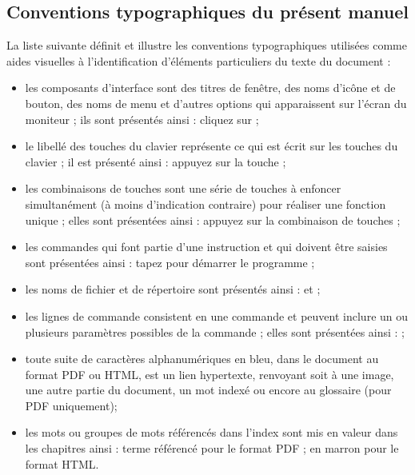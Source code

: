 \subsection{Conventions typographiques du présent manuel\label{introduction-manual-conventions}}

La liste suivante définit et illustre les conventions typographiques utilisées comme aides visuelles à l'identification d'éléments particuliers du texte du document :

\begin{itemize}
	\item les composants d'interface sont des titres de fenêtre, des noms d'icône et de bouton, des noms de menu et d'autres options qui apparaissent sur l'écran du moniteur ; ils sont présentés ainsi : \newline
\hspace*{1.5cm}cliquez sur  ;
	\item le libellé des touches du clavier représente ce qui est écrit sur les touches du clavier ; il est présenté ainsi : \newline
\hspace*{1.5cm}appuyez sur la touche  ;	
	\item les combinaisons de touches sont une série de touches à enfoncer 	simultanément (à moins d'indication contraire) pour réaliser une fonction 	unique ; elles sont présentées ainsi : \newline
\hspace*{1.5cm}appuyez sur la combinaison de touches  ;
	\item les commandes qui font partie d'une instruction et qui doivent être saisies sont présentées ainsi : \newline
\hspace*{1.5cm}tapez  pour démarrer le programme ;
	\item les noms de fichier et de répertoire sont présentés ainsi : \newline
\hspace*{1.5cm} et  ;	
	\item les lignes de commande consistent en une commande et peuvent inclure un ou plusieurs paramètres possibles de la commande ; elles sont présentées ainsi :  \newline
\hspace*{1.5cm}	 ;
	\item toute suite de caractères alphanumériques en bleu, dans le document au format PDF ou HTML, est un lien hypertexte, renvoyant soit à une image, une autre partie du document, un mot indexé ou encore au glossaire (pour PDF uniquement);
	\item les mots ou groupes de mots référencés dans l'index sont mis en valeur dans les chapitres ainsi : \newline
\hspace*{1.5cm}	\textsf{terme référencé} pour le format PDF ; \newline 
\hspace*{1.5cm} en marron pour le format HTML. 
\end{itemize}

